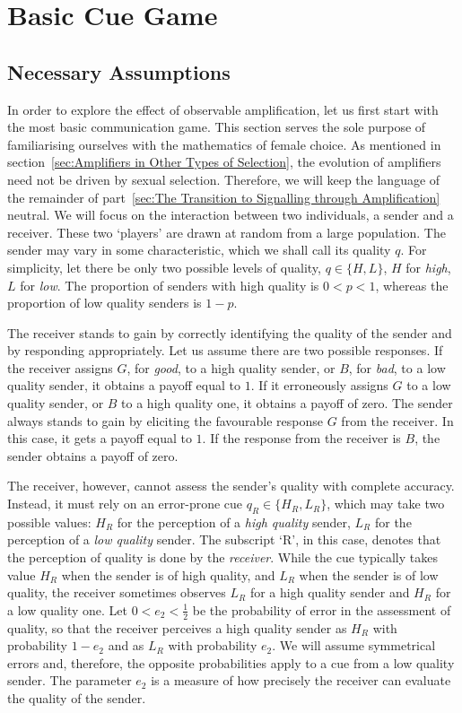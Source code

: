 \documentclass[a4paper,12pt]{article}
\numberwithin{equation}{section}
\begin{document}
\newpage\clearpage


\section{Basic Cue Game}
\label{sec:Basic Cue Game}
\subsection{Necessary Assumptions}
\label{sec:Basic Cue Game/Necessary Assumptions}

In order to explore the effect of observable amplification, let us first start with the most basic communication game. This section serves the sole purpose of familiarising ourselves with the mathematics of female choice. As mentioned in section~\ref{sec:Amplifiers in Other Types of Selection}, the evolution of amplifiers need not be driven by sexual selection. Therefore, we will keep the language of the remainder of part~\ref{sec:The Transition to Signalling through Amplification} neutral. We will focus on the interaction between two individuals, a sender and a receiver. These two `players' are drawn at random from a large population. The sender may vary in some characteristic, which we shall call its quality $q$. For simplicity, let there be only two possible levels of quality, $q\in\{H, L\}$, $H$ for \textit{high}, $L$ for \textit{low}. The proportion of senders with high quality is $0<p<1$, whereas the proportion of low quality senders is $1-p$.

The receiver stands to gain by correctly identifying the quality of the sender and by responding appropriately. Let us assume there are two possible responses. If the receiver assigns $G$, for \textit{good}, to a high quality sender, or $B$, for \textit{bad}, to a low quality sender, it obtains a payoff equal to $1$. If it erroneously assigns $G$ to a low quality sender, or $B$ to a high quality one, it obtains a payoff of zero. The sender always stands to gain by eliciting the favourable response $G$ from the receiver. In this case, it gets a payoff equal to $1$. If the response from the receiver is $B$, the sender obtains a payoff of zero.

The receiver, however, cannot assess the sender's quality with complete accuracy. Instead, it must rely on an error-prone cue $q_{R} \in \{H_{R}, L_{R}\}$, which may take two possible values: $H_{R}$ for the perception of a \textit{high quality} sender, $L_{R}$ for the perception of a \textit{low quality} sender. The subscript `R', in this case, denotes that the perception of quality is done by the \textit{receiver}. While the cue typically takes value $H_{R}$ when the sender is of high quality, and $L_{R}$ when the sender is of low quality, the receiver sometimes observes $L_{R}$ for a high quality sender and $H_{R}$ for a low quality one. Let $0<e_{2}<\frac{1}{2}$ be the probability of error in the assessment of quality, so that the receiver perceives a high quality sender as $H_{R}$ with probability $1-e_{2}$ and as $L_{R}$ with probability $e_{2}$. We will assume symmetrical errors and, therefore, the opposite probabilities apply to a cue from a low quality sender. The parameter $e_{2}$ is a measure of how precisely the receiver can evaluate the quality of the sender.
\end{document}
